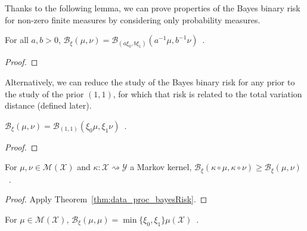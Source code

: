Thanks to the following lemma, we can prove properties of the Bayes binary risk for non-zero finite measures by considering only probability measures.

\begin{lemma}
  \label{lem:bayesBinaryRisk_mul}
  \leanok
  For all $a, b > 0$, $\mathcal B_\xi(\mu, \nu) = \mathcal B_{(a \xi_0, b \xi_1)}(a^{-1} \mu, b^{-1} \nu)$~.
\end{lemma}

\begin{proof}\leanok
\uses{}

\end{proof}

Alternatively, we can reduce the study of the Bayes binary risk for any prior to the study of the prior $(1, 1)$, for which that risk is related to the total variation distance (defined later).

\begin{lemma}
  \label{lem:bayesBinaryRisk_one_one}
  \leanok
  $\mathcal B_\xi(\mu, \nu) = \mathcal B_{(1,1)}(\xi_0\mu, \xi_1\nu)$~.
\end{lemma}

\begin{proof}\leanok
{}

\end{proof}

\begin{theorem}
  \label{thm:data_proc_bayesBinaryRisk}
  \leanok
  For $\mu, \nu \in \mathcal M(\mathcal X)$ and $\kappa : \mathcal X \rightsquigarrow \mathcal Y$ a Markov kernel, $\mathcal B_\xi(\kappa \circ \mu, \kappa \circ \nu) \ge \mathcal B_\xi(\mu, \nu)$~.
\end{theorem}

\begin{proof}\leanok
{}
Apply Theorem~\ref{thm:data_proc_bayesRisk}.
\end{proof}

\begin{lemma}
  \label{lem:bayesBinaryRisk_self}
  \leanok
  For $\mu \in \mathcal M(\mathcal X)$, $\mathcal B_\xi(\mu, \mu) = \min\{\xi_0, \xi_1\} \mu(\mathcal X)$~.
\end{lemma}


